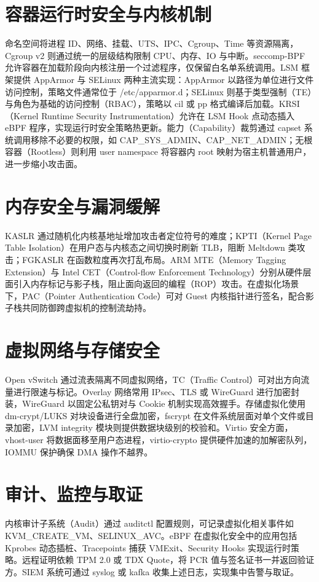 \chapter{容器运行时安全与内核机制}
命名空间将进程 ID、网络、挂载、UTS、IPC、Cgroup、Time 等资源隔离，Cgroup v2 则通过统一的层级结构限制 CPU、内存、IO 与中断。seccomp-BPF 允许容器在加载阶段向内核注册一个过滤程序，仅保留白名单系统调用。LSM 框架提供 AppArmor 与 SELinux 两种主流实现：AppArmor 以路径为单位进行文件访问控制，策略文件通常位于 /etc/apparmor.d；SELinux 则基于类型强制（TE）与角色为基础的访问控制（RBAC），策略以 cil 或 pp 格式编译后加载。KRSI（Kernel Runtime Security Instrumentation）允许在 LSM Hook 点动态插入 eBPF 程序，实现运行时安全策略热更新。能力（Capability）裁剪通过 capset 系统调用移除不必要的权限，如 CAP\_{}SYS\_{}ADMIN、CAP\_{}NET\_{}ADMIN；无根容器（Rootless）则利用 user namespace 将容器内 root 映射为宿主机普通用户，进一步缩小攻击面。\par
\chapter{内存安全与漏洞缓解}
KASLR 通过随机化内核基地址增加攻击者定位符号的难度；KPTI（Kernel Page Table Isolation）在用户态与内核态之间切换时刷新 TLB，阻断 Meltdown 类攻击；FGKASLR 在函数粒度再次打乱布局。ARM MTE（Memory Tagging Extension）与 Intel CET（Control-flow Enforcement Technology）分别从硬件层面引入内存标记与影子栈，阻止面向返回的编程（ROP）攻击。在虚拟化场景下，PAC（Pointer Authentication Code）可对 Guest 内核指针进行签名，配合影子栈共同防御跨虚拟机的控制流劫持。\par
\chapter{虚拟网络与存储安全}
Open vSwitch 通过流表隔离不同虚拟网络，TC（Traffic Control）可对出方向流量进行限速与标记。Overlay 网络常用 IPsec、TLS 或 WireGuard 进行加密封装，WireGuard 以固定公私钥对与 Cookie 机制实现高效握手。存储虚拟化使用 dm-crypt/LUKS 对块设备进行全盘加密，fscrypt 在文件系统层面对单个文件或目录加密，LVM integrity 模块则提供数据块级别的校验和。Virtio 安全方面，vhost-user 将数据面移至用户态进程，virtio-crypto 提供硬件加速的加解密队列，IOMMU 保护确保 DMA 操作不越界。\par
\chapter{审计、监控与取证}
内核审计子系统（Audit）通过 auditctl 配置规则，可记录虚拟化相关事件如 KVM\_{}CREATE\_{}VM、SELINUX\_{}AVC。eBPF 在虚拟化安全中的应用包括 Kprobes 动态插桩、Tracepoints 捕获 VMExit、Security Hooks 实现运行时策略。远程证明依赖 TPM 2.0 或 TDX Quote，将 PCR 值与签名证书一并返回验证方。SIEM 系统可通过 syslog 或 kafka 收集上述日志，实现集中告警与取证。\par
